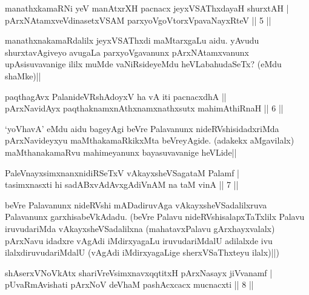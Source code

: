 
\begin{shl}
manathxkamaRNi yeV manAtxrXH pacnacx jeyxVSAThxdayaH shurxtAH | \\
pArxNAtamxveVdinasetxVSAM parxyoVgoV\s torxVpavaNayxRteV \hfill|| 5 || 
\end{shl}

\begin{artha} 
manathxnakamaRdalilx jeyxVSAThxdi maMtarxgaLu aidu. yAvudu 
shurxtavAgiveyo avugaLa parxyoVgavanunx pArxNAtamxvanunx 
upAsisuvavanige ililx muMde vaNiRsideyeMdu heVLabahudaSeTx? (eMdu 
shaMke)||
\end{artha}


\begin{shl}
paqthagAvx PalanideVRshAdoyxV ha vA iti pacnacxdhA || \\
pArxNavidAyx paqthaknamxnAthxnamxnathxsutx mahimAthiRnaH \hfill|| 6 || 
\end{shl}

\begin{artha} 
`yoVhavA' eMdu aidu bageyAgi beVre Palavanunx nideRVshisidadxriMda 
pArxNavideyxyu maMthakamaRkikxMta beVreyAgide. (adakekx aMgavilalx) 
maMthanakamaRvu mahimeyanunx bayasuvavanige heVLide||
\end{artha}


\begin{shl}
PaleV\s nayxsimxnanxnidiRSeTxV vAkayxsheVSagataM Palamf | \\
tasimxnasxti hi sadABxvAdAvxgAdiVnAM na taM vinA \hfill|| 7 || 
\end{shl}

\begin{artha} 
beVre Palavanunx nideRVshi mADadiruvAga vAkayxsheVSadalilxruva 
Palavanunx garxhisabeVkAdadu. (beVre Palavu nideRVshisalapxTaTxlilx 
Palavu iruvudariMda vAkayxsheVSadalilxna (mahatavxPalavu 
gArxhayxvalalx) pArxNavu idadxre vAgAdi iMdirxyagaLu iruvudariMdalU 
adilalxde ivu ilalxdiruvudariMdalU (vAgAdi iMdirxyagaLige 
sherxVSaThxteyu ilalx)||)
\end{artha}


\begin{shl}
shAserxVNoVkAtx shariVreV\s simxnavxqqtitxH pArxNasayx jiVvanamf | \\
pUvaRmAvishati pArxNoV deVhaM pashAcxcacx mucnacxti \hfill|| 8 || 
\end{shl}

